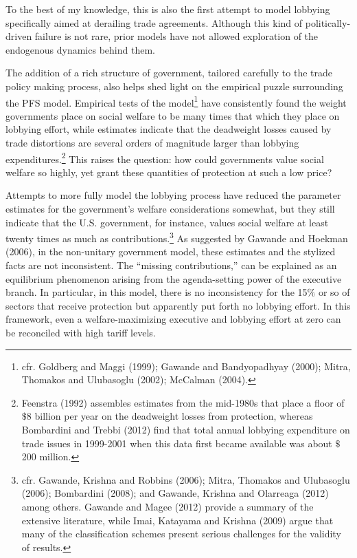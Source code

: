 \documentclass[10pt]{article}
\begin{document}
To the best of my knowledge, this is also the first attempt to model lobbying specifically aimed at derailing trade agreements. Although this kind of politically-driven failure is not rare, prior models have not allowed exploration of the endogenous dynamics behind them.

The addition of a rich structure of government, tailored carefully to the trade policy making process, also helps shed light on the empirical puzzle surrounding the PFS model. Empirical tests of the model\footnote{cfr. Goldberg and Maggi (1999); Gawande and Bandyopadhyay (2000); Mitra, Thomakos and Ulubasoglu (2002); McCalman (2004).\label{fn:gh_lobby}} have consistently found the weight governments place on social welfare to be many times that which they place on lobbying effort, while estimates indicate that the deadweight losses caused by trade distortions are several orders of magnitude larger than lobbying expenditures.\footnote{Feenstra (1992) assembles estimates from the mid-1980s that place a floor of $\$$8 billion per year on the deadweight losses from protection, whereas Bombardini and Trebbi (2012) find that total annual lobbying expenditure on trade issues in 1999-2001 when this data first became available was about $\$$200 million.} This raises the question: how could governments value social welfare so highly, yet grant these quantities of protection at such a low price?

Attempts to more fully model the lobbying process have reduced the parameter estimates for the government's welfare considerations somewhat, but they still indicate that the U.S. government, for instance, values social welfare at least twenty times as much as contributions.\footnote{cfr. Gawande, Krishna and Robbins (2006); Mitra, Thomakos and Ulubasoglu (2006); Bombardini (2008); and Gawande, Krishna and Olarreaga (2012) among others. Gawande and Magee (2012) provide a summary of the extensive literature, while Imai, Katayama and Krishna (2009) argue that many of the classification schemes present serious challenges for the validity of results.} As suggested by Gawande and Hoekman (2006), in the non-unitary government model, these estimates and the stylized facts are not inconsistent. The ``missing contributions,'' can be explained as an equilibrium phenomenon arising from the agenda-setting power of the executive branch. In particular, in this model, there is no inconsistency for the 15$\%$ or so of sectors that receive protection but apparently put forth no lobbying effort. In this framework, even a welfare-maximizing executive and lobbying effort at zero can be reconciled with high tariff levels.
\end{document}
